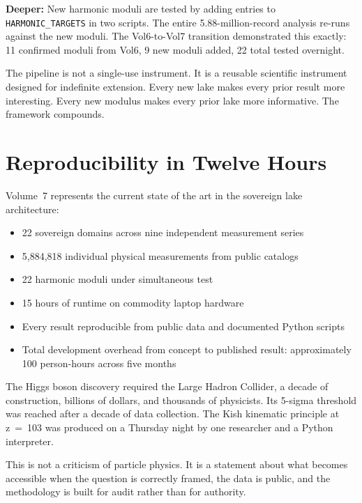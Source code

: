 \documentclass[11pt, letterpaper, openany]{book}
\begin{document}
\textbf{Deeper:} New harmonic moduli are tested by adding entries to
\texttt{HARMONIC\_TARGETS} in two scripts. The entire 5.88-million-record analysis
re-runs against the new moduli. The Vol6-to-Vol7 transition demonstrated this exactly:
11 confirmed moduli from Vol6, 9 new moduli added, 22 total tested overnight.

The pipeline is not a single-use instrument. It is a reusable scientific instrument
designed for indefinite extension. Every new lake makes every prior result more
interesting. Every new modulus makes every prior lake more informative. The framework
compounds.

\section*{Reproducibility in Twelve Hours}

Volume~7 represents the current state of the art in the sovereign lake architecture:
\begin{itemize}
\item 22 sovereign domains across nine independent measurement series
\item 5,884,818 individual physical measurements from public catalogs
\item 22 harmonic moduli under simultaneous test
\item 15 hours of runtime on commodity laptop hardware
\item Every result reproducible from public data and documented Python scripts
\item Total development overhead from concept to published result: approximately
      100 person-hours across five months
\end{itemize}

The Higgs boson discovery required the Large Hadron Collider, a decade of construction,
billions of dollars, and thousands of physicists. Its 5-sigma threshold was reached
after a decade of data collection. The Kish kinematic principle at z~=~103 was produced on
a Thursday night by one researcher and a Python interpreter.

This is not a criticism of particle physics. It is a statement about what becomes
accessible when the question is correctly framed, the data is public, and the methodology
is built for audit rather than for authority.

\end{document}
